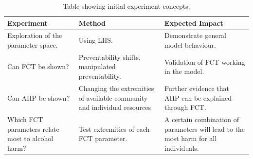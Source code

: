 \begin{table}[H]
\centering
\begin{tabular}{||p{}|p{}|p{}||}
 \hline
    Experiment & Method & Expected Impact \\[0.5ex] 
 \hline\hline
  Exploration of the parameter space. & Using \ac{LHS}. & Demonstrate general model behaviour. \\ 
  \hline
  Can \ac{FCT} be shown?  & Preventability shifts,  manipulated preventability. & Validation of \ac{FCT} working in the model. \\
  
  \hline
  Can \ac{AHP} be shown? & Changing the extremities of available community and individual resources & Further evidence that \ac{AHP} can be explained through \ac{FCT}. \\
  \hline
  
  Which \ac{FCT} parameters relate most to alcohol harm? & Test extremities of each \ac{FCT} parameter. & A certain combination of parameters will lead to the most harm for all individuals. \\ [1ex] 
 \hline
\end{tabular}
\caption{Table showing initial experiment concepts.}
\label{tab:experiments}
\end{table}

